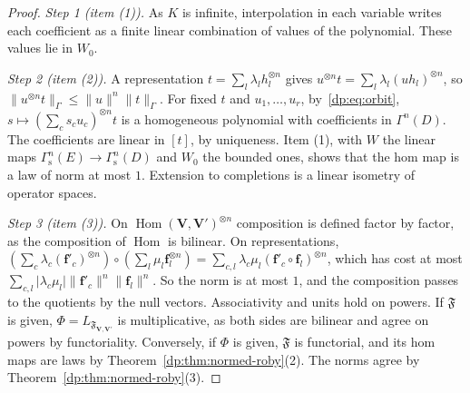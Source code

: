 \documentclass[11pt]{amsart}
\theoremstyle{definition}
\theoremstyle{remark}
\numberwithin{equation}{section}
\newcommand{\abs}[1]{\lvert #1\rvert}
\newcommand{\norm}[1]{\lVert #1\rVert}
\theoremstyle{plain}
\theoremstyle{definition}
\theoremstyle{plain}
\begin{document}
\begin{proof}
\emph{Step 1 (item (1)).} As $K$ is infinite, interpolation in each variable writes each coefficient as a finite linear combination of values of the polynomial. These values lie in $W_0$.

\emph{Step 2 (item (2)).} A representation $t=\sum_l\lambda_lh_l^{\otimes n}$ gives $u^{\otimes n}t=\sum_l\lambda_l(uh_l)^{\otimes n}$, so $\norm{u^{\otimes n}t}_\Gamma\le\norm u^n\norm t_\Gamma$. For fixed $t$ and $u_1,\dots,u_r$, by~\eqref{dp:eq:orbit}, $s\mapsto(\sum_cs_cu_c)^{\otimes n}t$ is a homogeneous polynomial with coefficients in $\Gamma^n(D)$. The coefficients are linear in $[t]$, by uniqueness. Item (1), with $W$ the linear maps $\Gamma^n_{\mathrm s}(E)\to\Gamma^n_{\mathrm s}(D)$ and $W_0$ the bounded ones, shows that the hom map is a law of norm at most $1$. Extension to completions is a linear isometry of operator spaces.

\emph{Step 3 (item (3)).} On $\operatorname{Hom}(\mathbf V,\mathbf V')^{\otimes n}$ composition is defined factor by factor, as the composition of $\operatorname{Hom}$ is bilinear. On representations, $(\sum_c\lambda_c(\mathbf f'_c)^{\otimes n})\circ(\sum_l\mu_l\mathbf f_l^{\otimes n})=\sum_{c,l}\lambda_c\mu_l(\mathbf f'_c\circ\mathbf f_l)^{\otimes n}$, which has cost at most $\sum_{c,l}\abs{\lambda_c\mu_l}\norm{\mathbf f'_c}^n\norm{\mathbf f_l}^n$. So the norm is at most $1$, and the composition passes to the quotients by the null vectors. Associativity and units hold on powers. If $\mathfrak F$ is given, $\Phi=L_{\mathfrak F_{\mathbf V,\mathbf V'}}$ is multiplicative, as both sides are bilinear and agree on powers by functoriality. Conversely, if $\Phi$ is given, $\mathfrak F$ is functorial, and its hom maps are laws by Theorem~\ref{dp:thm:normed-roby}(2). The norms agree by Theorem~\ref{dp:thm:normed-roby}(3).
\end{proof}
\end{document}
